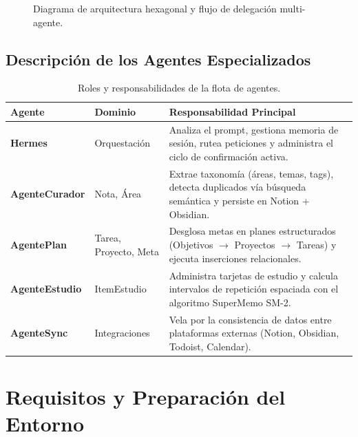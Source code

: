 \documentclass[11pt,a4paper]{article}
\begin{document}
\begin{figure}[!htbp]
\caption{Diagrama de arquitectura hexagonal y flujo de delegación multi-agente.}
\label{fig:arch_diagram}
\end{figure}

\subsection{Descripción de los Agentes Especializados}

\begin{table}[!htbp]
\centering
\caption{Roles y responsabilidades de la flota de agentes.}
\label{tab:agentes_summary}
\begin{tabularx}{\textwidth}{@{}llX@{}}
\toprule
\textbf{Agente} & \textbf{Dominio} & \textbf{Responsabilidad Principal} \\ \midrule
\textbf{Hermes} & Orquestación & Analiza el prompt, gestiona memoria de sesión, rutea peticiones y administra el ciclo de confirmación activa. \\
\textbf{AgenteCurador} & Nota, Área & Extrae taxonomía (áreas, temas, tags), detecta duplicados vía búsqueda semántica y persiste en Notion + Obsidian. \\
\textbf{AgentePlan} & Tarea, Proyecto, Meta & Desglosa metas en planes estructurados (Objetivos $\rightarrow$ Proyectos $\rightarrow$ Tareas) y ejecuta inserciones relacionales. \\
\textbf{AgenteEstudio} & ItemEstudio & Administra tarjetas de estudio y calcula intervalos de repetición espaciada con el algoritmo SuperMemo SM-2. \\
\textbf{AgenteSync} & Integraciones & Vela por la consistencia de datos entre plataformas externas (Notion, Obsidian, Todoist, Calendar). \\ \bottomrule
\end{tabularx}
\end{table}

\section{Requisitos y Preparación del Entorno}
\end{document}
